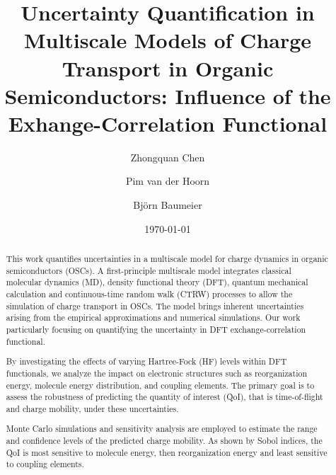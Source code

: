 \documentclass[%
 reprint,
superscriptaddress,
 amsmath,amssymb,
 aps,
prb,
floatfix
]{revtex4-2}
\newcommand{\bjoern}[2]{{\color{blue}{{\bf #1} #2}}}
\begin{document}
\title{Uncertainty Quantification in Multiscale Models of Charge Transport in Organic Semiconductors: Influence of the Exhange-Correlation Functional}

\author{Zhongquan Chen}
\author{Pim van der Hoorn}
\author{Bj\"orn Baumeier}

\date{\today}

\begin{abstract}
  \bjoern{TODO}{rewrite}This work quantifies uncertainties in a multiscale model for charge dynamics in organic semiconductors (OSCs). A first-principle multiscale model integrates classical molecular dynamics (MD), density functional theory (DFT), quantum mechanical calculation and continuous-time random walk (CTRW) processes to allow the simulation of charge transport in OSCs. The model brings inherent uncertainties arising from the empirical approximations and numerical simulations. Our work particularly focusing on quantifying the uncertainty in DFT exchange-correlation functional.

  By investigating the effects of varying Hartree-Fock (HF) levels within DFT functionals, we analyze the impact on electronic structures such as reorganization energy, molecule energy distribution, and coupling elements. The primary goal is to assess the robustness of predicting the quantity of interest (QoI), that is time-of-flight and charge mobility, under these uncertainties.
  
  Monte Carlo simulations and sensitivity analysis are employed to estimate the range and confidence levels of the predicted charge mobility. As shown by Sobol indices, the QoI is most sensitive to molecule energy, then reorganization energy and least sensitive to coupling elements.  
\end{abstract}


\maketitle
\end{document}

